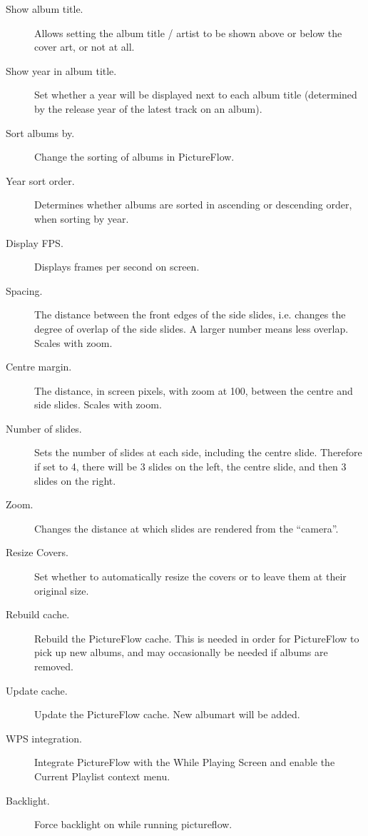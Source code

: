 \begin{description}
  \item[Show album title.] Allows setting the album title / artist to be
  shown above or below the cover art, or not at all.
  \item[Show year in album title.] Set whether a year will be displayed next to each album
  title (determined by the release year of the latest track on an album).
  \item[Sort albums by.] Change the sorting of albums in PictureFlow.
  \item[Year sort order.] Determines whether albums are sorted in ascending or descending
  order, when sorting by year.
  \item[Display FPS.] Displays frames per second on screen.
  \item[Spacing.] The distance between the front edges of the side slides, i.e. changes
  the degree of overlap of the side slides. A larger number means less overlap. Scales with zoom.
  \item[Centre margin.] The distance, in screen pixels, with zoom at 100, between
  the centre and side slides. Scales with zoom.
  \item[Number of slides.] Sets the number of slides at each side, including the
  centre slide. Therefore if set to 4, there will be 3 slides on the left,
  the centre slide, and then 3 slides on the right.
  \item[Zoom.] Changes the distance at which slides are rendered from the ``camera''.
  \item[Resize Covers.] Set whether to automatically resize the covers or to leave
  them at their original size.
  \item[Rebuild cache.] Rebuild the PictureFlow cache. This is needed in order
  for PictureFlow to pick up new albums, and may occasionally be needed if albums
  are removed.
  \item[Update cache.] Update the PictureFlow cache. New albumart will be added.
  \item[WPS integration.] Integrate PictureFlow with the While Playing Screen and enable
  the Current Playlist context menu.
  \item[Backlight.] Force backlight on while running pictureflow.
\end{description}
